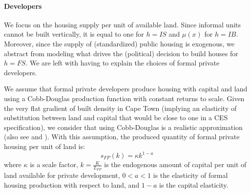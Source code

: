 \documentclass[12pt]{article}
\begin{document}


\paragraph{Developers}

We focus on the housing supply per unit of available land. Since informal units cannot be built vertically, it is equal to one for $h=IS$ and $\mu(x)$ for $h=IB$. Moreover, since the supply of (standardized) public housing is exogenous, we abstract from modeling what drives the (political) decision to build houses for $h=FS$. We are left with having to explain the choices of formal private developers.

We assume that formal private developers produce housing with capital and land using a Cobb-Douglas production function with constant returns to scale. Given the very flat gradient of built density in Cape Town (implying an elasticity of substitution between land and capital that would be close to one in a CES specification), we consider that using Cobb-Douglas is a realistic approximation (also see \citet{Epple2010AHousing} and \citet{Combes2021TheFrance}). With this assumption, the produced quantity of formal private housing per unit of land is:
\begin{equation}
\label{eq_init_hsupply}
    s_{FP}(k) = \kappa k^{1-a}
\end{equation}
where $\kappa$ is a scale factor, $k = \frac{K}{L_{FP}}$ is the endogenous amount of capital per unit of land available for private development, $0<a<1$ is the elasticity of formal housing production with respect to land, and $1-a$ is the capital elasticity.
\end{document}
